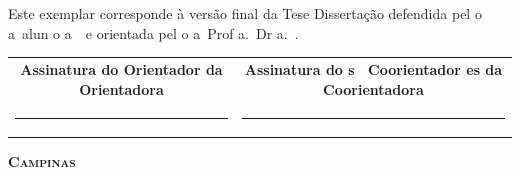 \vfill



\begin{flushleft}
  \begin{minipage}[c]{.5\textwidth}\footnotesize 
 Este exemplar corresponde à versão final da
\ifx\mestrado\undefined
    Tese
    \else
    Dissertação
    \fi
    defendida pel\ifx\femaleOrientador\undefined
    o\else
  a\fi\
  alun\ifx\femaleOrientador\undefined
    o\else
  a\fi\
  \autor\
    e orientada 
    pel\ifx\femaleOrientador\undefined
    o\else
  a\fi\
  Prof\ifx\femaleOrientador\undefined
    \else
  a\fi.~Dr\ifx\femaleOrientador\undefined
    \else
  a\fi.~\orientador.
 \end{minipage}
\end{flushleft}

\vfill
\begin{tabular}{c@{\hskip 1in}c}
{\small\textbf{Assinatura
\ifx\femaleOrientador\undefined
do Orientador
\else
da Orientadora
\fi
}} & 

\ifx\coorientador\undefined
\else
{\small\textbf{Assinatura
\ifx\femaleCoorientador\undefined
do\ifx\Coorientadores\undefined
\else s \fi\
Coorientador\ifx\Coorientadores\undefined
\else es \fi 
\else
da Coorientadora
\fi } }\\[0.6cm]

\rule[1pt]{6cm}{.5pt}  %
 & 
\rule[1pt]{7cm}{.5pt}  %
\end{tabular}

\vfill
\begin{center}
  {\small\textbf{\textsc{ Campinas \\ \ano}}}
\end{center}
